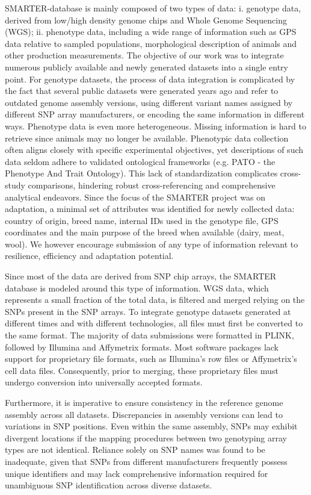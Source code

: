 \documentclass[a4paper,num-refs,gigabyte]{oup-contemporary}
\begin{document}
SMARTER-database is mainly composed of two types of data: i. genotype data, derived from low/high density genome chips and Whole Genome Sequencing (WGS); ii. phenotype data, including a wide range of information such as GPS data relative to sampled populations, morphological description of animals and other production measurements.
The objective of our work was to integrate numerous publicly available and newly generated datasets into a single entry point.
For genotype datasets, the process of data integration is complicated by the fact that several public datasets were generated years ago and refer to outdated genome assembly versions, using different variant names assigned by different SNP array manufacturers, or encoding the same information in different ways.
Phenotype data is even more heterogeneous. Missing information is hard to retrieve since animals may no longer be available. Phenotypic data collection often aligns closely with specific experimental objectives, yet descriptions of such data seldom adhere to validated ontological frameworks (e.g. PATO - the Phenotype And Trait Ontology\citep{PATO}). This lack of standardization complicates cross-study comparisons, hindering robust cross-referencing and comprehensive analytical endeavors. Since the focus of the SMARTER project was on adaptation, a minimal set of attributes was identified for newly collected data: country of origin, breed name, internal IDs used in the genotype file, GPS coordinates and the main purpose of the breed when available (dairy, meat, wool).  We however encourage submission of any type of information relevant to resilience, efficiency and adaptation potential.

Since most of the data are derived from SNP chip arrays, the SMARTER database is modeled around this type of information. WGS data, which represents a small fraction of the total data, is filtered and merged relying on the SNPs present in the SNP arrays. To integrate genotype datasets generated at different times and with different technologies, all files must first be converted to the same format. The majority of data submissions were formatted in PLINK\citep{Purcell2007}, followed by Illumina and Affymetrix formats. Most software packages lack support for proprietary file formats, such as Illumina’s row files or Affymetrix’s cell data files. Consequently, prior to merging, these proprietary files must undergo conversion into universally accepted formats.

Furthermore, it is imperative to ensure consistency in the reference genome assembly across all datasets. Discrepancies in assembly versions can lead to variations in SNP positions. Even within the same assembly, SNPs may exhibit divergent locations if the mapping procedures between two genotyping array types are not identical\citep{Fadista2012,Gershoni2022}. Reliance solely on SNP names was found to be inadequate, given that SNPs from different manufacturers frequently possess unique identifiers and may lack comprehensive information required for unambiguous SNP identification across diverse datasets.
\end{document}
